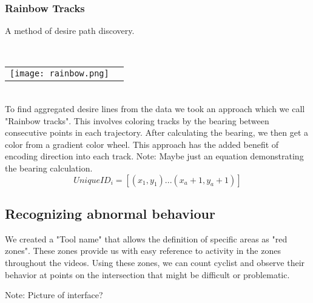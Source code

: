 \subsubsection{Rainbow Tracks}

A method of desire path discovery.

\ \\ 
\noindent
\begin{tabular}{@{}cc}
\texttt{[image: rainbow.png]} 
\end{tabular}
\label{Rainbow}
\ \\

To find aggregated desire lines from the data we took an approach which we call "Rainbow tracks". This involves coloring tracks by the bearing between consecutive points in each trajectory. After calculating the bearing, we then get a color from a gradient color wheel. This approach has the added benefit of encoding direction into 
each track.
Note: Maybe just an equation demonstrating the bearing calculation.
\ \\ 

\begin{equation}
  UniqueID_i = [(x_1, y_1)...(x_a+1, y_a+1)]\label{eq:3}
\end{equation}

\subsection{Recognizing abnormal behaviour}

\color{red}
We created a "Tool name" that allows the definition of specific areas as "red zones". These zones provide us with easy reference to activity in the zones throughout the videos.
Using these zones, we can count cyclist and observe their behavior at points on the intersection that might be difficult or
problematic.

Note: Picture of interface?
